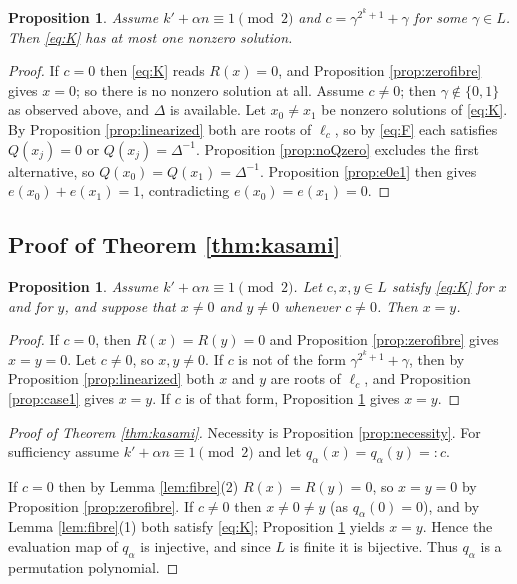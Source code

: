 \documentclass[11pt,a4paper]{article}
\newtheorem{proposition}[theorem]{Proposition}
\theoremstyle{definition}
\newcommand{\rhs}{R}
\begin{document}
\begin{proposition}\label{prop:case2}
Assume $k'+\alpha n\equiv1\pmod2$ and $c=\gamma^{2^{k}+1}+\gamma$ for some
$\gamma\in L$.  Then \eqref{eq:K} has at most one nonzero solution.
\end{proposition}

\begin{proof}
If $c=0$ then \eqref{eq:K} reads $\rhs(x)=0$, and Proposition
\ref{prop:zerofibre} gives $x=0$; so there is no nonzero solution at all.
Assume $c\ne 0$; then $\gamma\notin\{0,1\}$ as observed above, and $\Delta$ is
available.  Let $x_0\neq x_1$ be nonzero solutions of \eqref{eq:K}.  By
Proposition \ref{prop:linearized} both are roots of $\ell_c$, so by \eqref{eq:F}
each satisfies $Q(x_j)=0$ or $Q(x_j)=\Delta^{-1}$.  Proposition
\ref{prop:noQzero} excludes the first alternative, so
$Q(x_0)=Q(x_1)=\Delta^{-1}$.  Proposition \ref{prop:e0e1} then gives
$e(x_0)+e(x_1)=1$, contradicting $e(x_0)=e(x_1)=0$.
\end{proof}

\subsection{Proof of Theorem \ref{thm:kasami}}

\begin{proposition}\label{prop:unique}
Assume $k'+\alpha n\equiv1\pmod2$.  Let $c,x,y\in L$ satisfy \eqref{eq:K} for $x$
and for $y$, and suppose that $x\neq0$ and $y\neq0$ whenever $c\neq0$.  Then
$x=y$.
\end{proposition}

\begin{proof}
If $c=0$, then $\rhs(x)=\rhs(y)=0$ and Proposition \ref{prop:zerofibre} gives
$x=y=0$.  Let $c\neq0$, so $x,y\neq0$.  If $c$ is not of the form
$\gamma^{2^{k}+1}+\gamma$, then by Proposition \ref{prop:linearized} both $x$ and
$y$ are roots of $\ell_c$, and Proposition \ref{prop:case1} gives $x=y$.  If $c$
is of that form, Proposition \ref{prop:case2} gives $x=y$.
\end{proof}

\begin{proof}[Proof of Theorem \ref{thm:kasami}]
Necessity is Proposition \ref{prop:necessity}.  For sufficiency assume
$k'+\alpha n\equiv1\pmod2$ and let $q_\alpha(x)=q_\alpha(y)=:c$.

If $c=0$ then by Lemma \ref{lem:fibre}(2) $\rhs(x)=\rhs(y)=0$, so $x=y=0$ by
Proposition \ref{prop:zerofibre}.  If $c\neq0$ then $x\neq0\neq y$ (as
$q_\alpha(0)=0$), and by Lemma \ref{lem:fibre}(1) both satisfy \eqref{eq:K};
Proposition \ref{prop:unique} yields $x=y$.  Hence the evaluation map of
$q_\alpha$ is injective, and since $L$ is finite it is bijective.  Thus
$q_\alpha$ is a permutation polynomial.
\end{proof}
\end{document}
